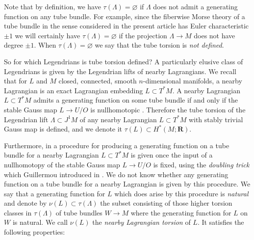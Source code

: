 \documentclass{amsart}
\def\bR{\mathbf{R}}
\theoremstyle{definition}
\theoremstyle{remark}
\newtheorem{inductive lemma}[theorem]{Inductive Lemma}
\begin{document}
 
 
Note that by definition, we have $\tau(\Lambda) =\varnothing$ if $\Lambda$ does not admit a generating function on any tube bundle. For example, since the fiberwise Morse theory of a tube bundle in the sense considered in the present article has Euler characteristic $\pm 1$  we will certainly have $\tau(\Lambda)=\varnothing$ if the projection $\Lambda \to M$ does not have degree $\pm 1$. %
When $\tau(\Lambda)=\varnothing$ we say that the tube torsion is {\em not defined}. 

So for which Legendrians  is tube torsion defined? A particularly elusive class of Legendrians is given by the Legendrian lifts of nearby Lagrangians. We recall that for $L$ and $M$ closed, connected, smooth $n$-dimensional manifolds, a nearby Lagrangian is an exact Lagrangian embedding $L \subset T^*M$. %
A nearby Lagrangian $L \subset T^*M$ admits a generating function on some tube bundle if and only if the stable Gauss map $L \to U/O$ is nullhomotopic \cite{ACGK}. Therefore the tube torsion of the Legendrian lift $\Lambda \subset J^1 M$ of any nearby Lagrangian $L \subset T^*M$ with stably trivial Gauss map is defined, and we denote it $\tau(L) \subset H^*(M;\bR)$. 
 
 Furthermore, in \cite{ACGK} a procedure for producing a generating function on a tube bundle for a nearby Lagrangian $L \subset T^*M$ is given once the input of a nullhomotopy of the stable Gauss map $L \to U/O$ is fixed, using the {\em doubling trick} which Guillermou introduced in \cite{Gui12}. We do not know whether any generating function on a tube bundle for a nearby Lagrangian is given by this procedure. We say that a generating function for $L$ which does arise by this procedure is {\em natural} and denote by $\nu(L)  \subset \tau(\Lambda) $ the subset consisting of those higher torsion classes in $\tau(\Lambda)$ of tube bundles $W \to M$ where the generating function for $L$ on $W$ is natural. We call $\nu(L)$  the {\em nearby Lagrangian torsion} of $L$. It satisfies the following properties:
 
\end{document}
